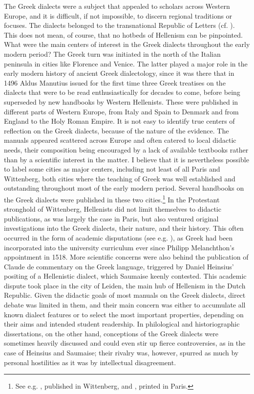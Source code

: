 \documentclass[output=paper]{langsci/langscibook}
\begin{document}
The Greek dialects were a subject that appealed to scholars across Western Europe, and it is difficult, if not impossible, to discern regional traditions or focuses. The dialects belonged to the transnational Republic of Letters (cf. \citealt{BotsWaquet1997}). This does not mean, of course, that no hotbeds of Hellenism can be pinpointed. What were the main centers of interest in the Greek dialects throughout the early modern period? The Greek turn was initiated in the north of the Italian peninsula in cities like Florence and Venice. The latter played a major role in the early modern history of ancient Greek dialectology, since it was there that in 1496 Aldus Manutius issued for the first time three Greek treatises on the dialects that were to be read enthusiastically for decades to come, before being superseded by new handbooks by Western Hellenists. These were published in different parts of Western Europe, from Italy and Spain to Denmark and from England to the Holy Roman Empire. It is not easy to identify true centers of reflection on the Greek dialects, because of the nature of the evidence. The manuals appeared scattered across Europe and often catered to local didactic needs, their composition being encouraged by a lack of available textbooks rather than by a scientific interest in the matter. I believe that it is nevertheless possible to label some cities as major centers, including not least of all Paris and Wittenberg, both cities where the teaching of Greek was well established and outstanding throughout most of the early modern period. Several handbooks on the Greek dialects were published in these two cities.\footnote{See e.g. \citet{Schmidt1604}, published in Wittenberg, and \citet{Mérigon1621}, printed in Paris.} In the Protestant stronghold of Wittenberg, Hellenists did not limit themselves to didactic publications, as was largely the case in Paris, but also ventured original investigations into the Greek dialects, their nature, and their history. This often occurred in the form of academic disputations (see e.g. \citealt{Thryllitsch1709}), as Greek had been incorporated into the university curriculum ever since Philipp Melanchthon’s appointment in 1518. More scientific concerns were also behind the publication of Claude de  commentary on the Greek language, triggered by Daniel Heinsius’ positing of a Hellenistic dialect, which Saumaise keenly contested. This academic dispute took place in the city of Leiden, the main hub of Hellenism in the Dutch Republic. Given the didactic goals of most manuals on the Greek dialects, direct debate was limited in them, and their main concern was either to accumulate all known dialect features or to select the most important properties, depending on their aims and intended student readership. In philological and historiographic dissertations, on the other hand, conceptions of the Greek dialects were sometimes heavily discussed and could even stir up fierce controversies, as in the case of Heinsius and Saumaise; their rivalry was, however, spurred as much by personal hostilities as it was by intellectual disagreement.
\end{document}
